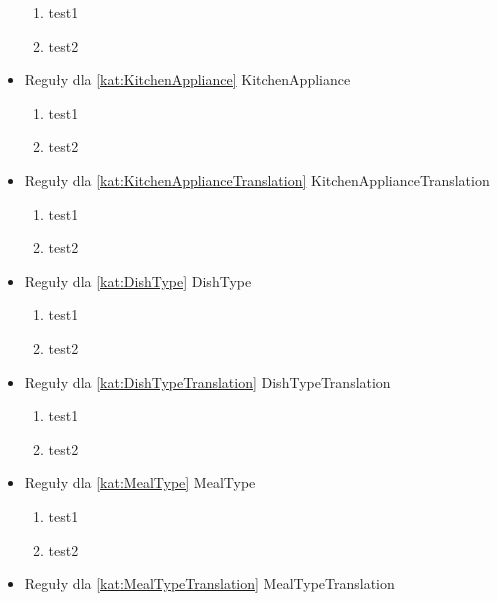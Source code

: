 \begin{itemize}[label={}]
    \begin{enumerate}[label={\textbf{REG/\protect\threedigits{\arabic{enumi}}}}, wide, labelwidth=!, resume]
        \item test1
        \item test2
    \end{enumerate}
    \item Reguły dla \ref{kat:KitchenAppliance} KitchenAppliance
    \begin{enumerate}[label={\textbf{REG/\protect\threedigits{\arabic{enumi}}}}, wide, labelwidth=!, resume]
        \item test1
        \item test2
    \end{enumerate}
    \item Reguły dla \ref{kat:KitchenApplianceTranslation} KitchenApplianceTranslation
    \begin{enumerate}[label={\textbf{REG/\protect\threedigits{\arabic{enumi}}}}, wide, labelwidth=!, resume]
        \item test1
        \item test2
    \end{enumerate}
    \item Reguły dla \ref{kat:DishType} DishType
    \begin{enumerate}[label={\textbf{REG/\protect\threedigits{\arabic{enumi}}}}, wide, labelwidth=!, resume]
        \item test1
        \item test2
    \end{enumerate}
    \item Reguły dla \ref{kat:DishTypeTranslation} DishTypeTranslation
    \begin{enumerate}[label={\textbf{REG/\protect\threedigits{\arabic{enumi}}}}, wide, labelwidth=!, resume]
        \item test1
        \item test2
    \end{enumerate}
    \item Reguły dla \ref{kat:MealType} MealType
    \begin{enumerate}[label={\textbf{REG/\protect\threedigits{\arabic{enumi}}}}, wide, labelwidth=!, resume]
        \item test1
        \item test2
    \end{enumerate}
    \item Reguły dla \ref{kat:MealTypeTranslation} MealTypeTranslation

\end{itemize}
